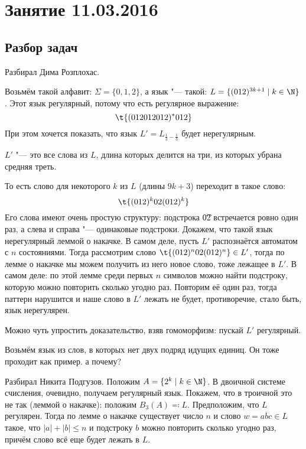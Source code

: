 \chapter{Занятие 11.03.2016}
\section{Разбор задач}

	Разбирал Дима Розплохас.

	Возьмём такой алфавит: $\Sigma=\{0,1,2\}$,
	а язык "--- такой: $L = \{(012)^{3k+1} \mid k \in \N \}$.
	Этот язык регулярный, потому что есть регулярное выражение:
	\[ \t{(012012012)^*012} \]
	При этом хочется показать, что язык $L'=L_{\frac13-\frac13}$ будет нерегулярным.
	\begin{Rem}
		$L'$ "--- это все слова из $L$, длина которых делится на три, из которых убрана средняя треть.
	\end{Rem}
	То есть слово для некоторого $k$ из $L$ (длины $9k+3$) переходит в такое слово:
	\[ \t{(012)^k02(012)^k} \]
	Его слова имеют очень простую структуру: подстрока \t{02} встречается ровно один раз,
	а слева и справа "--- одинаковые подстроки.
	Докажем, что такой язык нерегулярный леммой о накачке.
	В самом деле, пусть $L'$ распознаётся автоматом с $n$ состояниями.
	Тогда рассмотрим слово $\t{(012)^n02(012)^n} \in L'$, тогда по лемме о накачке мы можем
	получить из него новое слово, тоже лежащее в $L'$.
	В самом деле: по этой лемме среди первых $n$ символов можно найти подстроку,
	которую можно повторить сколько угодно раз.
	Повторим её один раз, тогда паттерн нарушится и наше слово в $L'$ лежать не будет,
	противоречие, стало быть, язык нерегулярен.

	\begin{Rem}
		Можно чуть упростить доказательство, взяв гомоморфизм:
		пускай $L'$ регулярный.
		\TODO
	\end{Rem}

	\begin{Rem}
		Возьмём язык из слов, в которых нет двух подряд идущих единиц.
		Он тоже проходит как пример.
		\TODO а почему?
	\end{Rem}

	Разбирал Никита Подгузов.
	Положим $A = \{ 2^k \mid k \in \N \}$.
	В двоичной системе счисления, очевидно, получаем регулярный язык.
	Покажем, что в троичной это не так (леммой о накачке): положим $B_3(A) \eqcolon L$.
	Предположим, что $L$ регулярен.
	Тогда по лемме о накачке существует число $n$ и слово $w=\overline{abc} \in L$ такое, что $|a|+|b| \le n$
	и подстроку $b$ можно повторить сколько угодно раз, причём слово всё еще будет лежать в $L$.

